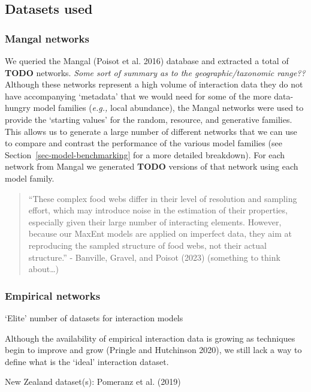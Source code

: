 \documentclass[
  letterpaper,
  DIV=11,
  numbers=noendperiod]{scrartcl}
\begin{document}
\subsection{Datasets used}\label{datasets-used}

\subsubsection{Mangal networks}\label{mangal-networks}

We queried the Mangal (Poisot et al. 2016) database and extracted a
total of \textbf{TODO} networks. \emph{Some sort of summary as to the
geographic/taxonomic range??} Although these networks represent a high
volume of interaction data they do not have accompanying `metadata' that
we would need for some of the more data-hungry model families
(\emph{e.g.,} local abundance), the Mangal networks were used to provide
the `starting values' for the random, resource, and generative families.
This allows us to generate a large number of different networks that we
can use to compare and contrast the performance of the various model
families (see Section~\ref{sec-model-benchmarking} for a more detailed
breakdown). For each network from Mangal we generated \textbf{TODO}
versions of that network using each model family.

\begin{quote}
``These complex food webs differ in their level of resolution and
sampling effort, which may introduce noise in the estimation of their
properties, especially given their large number of interacting elements.
However, because our MaxEnt models are applied on imperfect data, they
aim at reproducing the sampled structure of food webs, not their actual
structure.'' - Banville, Gravel, and Poisot (2023) (something to think
about\ldots)
\end{quote}

\subsubsection{Empirical networks}\label{empirical-networks}

`Elite' number of datasets for interaction models

Although the availability of empirical interaction data is growing as
techniques begin to improve and grow (Pringle and Hutchinson 2020), we
still lack a way to define what is the `ideal' interaction dataset.

New Zealand dataset(s): Pomeranz et al. (2019)
\end{document}
